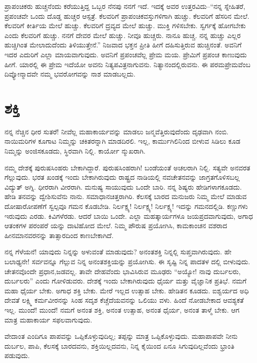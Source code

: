 ಪ್ರಾಪಂಚಿಕರು ಹುಚ್ಚನೆಂದು ಕರೆಯುತ್ತಿದ್ದ ಒಬ್ಬರ ನೆನಪು ನನಗೆ ಇದೆ. ಇದಕ್ಕೆ ಅವರ ಉತ್ತರವಿದು–“ನನ್ನ ಸ್ನೇಹಿತರೆ, ಪ್ರಪಂಚವೇ ಒಂದು ದೊಡ್ಡ ಹುಚ್ಚರ ಆಸ್ಪತ್ರೆ. ಕೆಲವರಿಗೆ ಪ್ರಾಪಂಚಿಕವಸ್ತುಗಳಿಗಾಗಿ ಹುಚ್ಚು. ಕೆಲವರಿಗೆ ಹೆಸರಿನ ಮೇಲೆ. ಕೆಲವರಿಗೆ ಕೀರ್ತಿಯ ಮೇಲೆ ಹುಚ್ಚು. ಕೆಲವರಿಗೆ ದ್ರವ್ಯದ ಮೇಲೆ ಹುಚ್ಚು. ಮುಕ್ತಿ ಗಳಿಸಬೇಕು. ಸ್ವರ್ಗಕ್ಕೆ ಹೋಗಬೇಕು ಎಂದು ಕೆಲವರಿಗೆ ಹುಚ್ಚು. ನನಗೆ ದೇವರ ಮೇಲೆ ಹುಚ್ಚು. ನೀವೂ ಹುಚ್ಚರು. ನಾನೂ ಹುಚ್ಚ. ನನ್ನ ಹುಚ್ಚು ಎಲ್ಲರ ಹುಚ್ಚಿಗಿಂತ ಮೇಲಾದುದೆಂದು ತಿಳಿಯುತ್ತೇನೆ.” ನಿಜವಾದ ಭಕ್ತನ ಪ್ರೀತಿ ಹೀಗೆ ದಹಿಸುತ್ತಿರುವ ಹುಚ್ಚಿನಂತೆ. ಅವನಿಗೆ ಇದರ ಎದುರಿಗೆ ಎಲ್ಲಾ ಮಾಯವಾಗುವುದು. ಅವನಿಗೆ ಪ್ರಪಂಚವೆಲ್ಲ ಪ್ರೇಮ ಮಯ. ಪ್ರೇಮಿಗೆ ಪ್ರಪಂಚ ಕಾಣುವುದು ಹೀಗೆ. ಯಾರಲ್ಲಿ ಈ ಪ್ರೇಮ ಇದೆಯೋ ಅವನು ನಿತ್ಯಪವಿತ್ರನಾಗುವನು. ನಿತ್ಯಾನಂದಲ್ಲಿರುವನು. ಈ ಪರಮಪ್ರೇಮವೆಂಬ ದಿವ್ಯೋನ್ಮಾದವೇ ನಮ್ಮ ಭವರೋಗವನ್ನು ನಾಶ ಮಾಡಬಲ್ಲದು.


\section{ಶಕ್ತಿ}

ನನ್ನ ನೆಚ್ಚಿನ ಧೀರ ಸುತರೆ! ನೀವೆಲ್ಲ ಮಹಾಕಾರ್ಯವನ್ನು ಮಾಡಲು ಜನ್ಮವೆತ್ತಿರುವುದೆಂದು ದೃಢವಾಗಿ ನಂಬಿ. ನಾಯಿಮರಿಗಳ ಕೂಗಾಟ ನಿಮ್ಮನ್ನು ಚಕಿತರನ್ನಾಗಿ ಮಾಡದಿರಲಿ. ಇಲ್ಲ, ಕಾರ್ಮುಗಿಲಿನಿಂದ ಬೀಳುವ ಸಿಡಿಲು ಕೂಡ ನಿಮ್ಮನ್ನು ಅಂಜಿಸಕೂಡದು, ಸ್ಥಿರವಾಗಿ ನಿಲ್ಲಿ. ಕಾರ್ಯೋ ನ್ಮುಖರಾಗಿ.

ನಮ್ಮ ದೇಶಕ್ಕೆ ಪುರುಷಸಿಂಹರು ಬೇಕಾಗಿದ್ದಾರೆ. ಪುರುಷಸಿಂಹರಾಗಿ! ಬಂಡೆಯಂತೆ ಅಚಲರಾಗಿ ನಿಲ್ಲಿ. ಸತ್ಯವೇ ಅನವರತ ಗೆಲ್ಲುವುದು. ಭರತ ಖಂಡಕ್ಕೆ ಇಂದು ಬೇಕಾಗಿರುವುದು ರಾಷ್ಟ್ರದ ನಾಡಿಯಲ್ಲಿ ನವಚೇತನವನ್ನು ಜಾಗ್ರತಗೊಳಿಸಬಲ್ಲ ವಿದ್ಯುತ್ ಅಗ್ನಿ. ಧೀರರಾಗಿ ವೀರರಾಗಿ. ಮನುಷ್ಯ ಸಾಯುವುದು ಒಂದೇ ಬಾರಿ. ನನ್ನ ಶಿಷ್ಯರು ಹೇಡಿಗಳಾಗಕೂಡದು. ಹೇಡಿ ತನವನ್ನು ದ್ವೇಶಿಸುವೆನು ನಾನು. ಸಮಾಧಾನಚಿತ್ತರಾಗಿರಿ. ಕೆಲಸಕ್ಕೆ ಬಾರದ ಮನುಜರು ನಿಮ್ಮ ಮೇಲೆ ಮಾಡುವ ದೋಷಾರೋಪಣೆಗೆ ಸ್ವಲ್ಪವೂ ಗಮನ ಕೊಡಬೇಡಿ. ನಿರ್ಲಕ್ಷ್ಯ! ನಿರ್ಲಕ್ಷ್ಯ! ನಿರ್ಲಕ್ಷ್ಯ! ಇದನ್ನು ಗಮನದಲ್ಲಿಡಿ. ಕಣ್ಣುಗಳು ಇರುವುದು ಎರಡು. ಕಿವಿಗಳೆರಡು. ಆದರೆ ಬಾಯಿ ಒಂದೇ. ಎಲ್ಲಾ ಮಹತ್ಕಾರ್ಯಗಳೂ ಜಯಪ್ರದವಾಗುವುದು, ಅಗಾಧ ಆತಂಕಗಳ ಪರಂಪರೆ ಯನ್ನು ದಾಟಿಹೋದ ಮೇಲೆ. ನಿಮ್ಮ ಪೌರುಷ ಪ್ರಯೋಗಿಸಿ, ಕಾಮಕಾಂಚನ ವಶರಾದ ಹೀನಮಾನವರನನ್ನು ತಾತ್ಸಾರದಿಂದ ಕಾಣಬೇಕಾಗಿದೆ.

ನನ್ನ ಗೆಳೆಯನೆ! ಯಾವುದು ನಿನ್ನನ್ನು ಅಳುವಂತೆ ಮಾಡುವುದು? ಅನಂತಶಕ್ತಿ ನಿನ್ನಲ್ಲಿ ಸುಪ್ತವಾಗಿರುವುದು. ಹೇ ಬಲಾಢ್ಯನೇ! ಸರ್ವವನ್ನೂ ಗೆಲ್ಲುವ ನಿನ್ನ ಅನಂತಶಕ್ತಿಯನ್ನು ಪ್ರಯೋಗಿಸು. ಈ ಸೃಷ್ಟಿ ನಿನ್ನ ಪಾದತಳ ದಲ್ಲಿ ಬೀಳುವುದು. ಚೇತನವೊಂದೇ ಪ್ರಧಾನ,ಜಡವಲ್ಲ. ತಾವೇ ದೇಹವೆಂದು ಭಾವಿಸಿರುವ ಮೂಢರು “ಅಯ್ಯೋ! ನಾವು ದುರ್ಬಲರು, ದುರ್ಬಲರು” ಎಂದು ಗೋಳಿಡುವರು. ದೇಶಕ್ಕೆ ಇಂದು ಬೇಕಾಗಿರುವುದು ಧೈರ್ಯ ಮತ್ತು ವೈಜ್ಞಾನಿಕ ಪ್ರತಿಭೆ. ನಮಗೆ ಮಹಾ ಧೈರ್ಯ ಬೇಕು. ಅಗಾಧ ಶಕ್ತಿ ಬೇಕು. ಮೇರೆ ಇಲ್ಲದ ಉತ್ಸಾಹ ಬೇಕು. ಹೇಡಿತನ ಕೂಡದು. ಐಶ್ವರ್ಯದ ಅಧಿ ದೇವತೆ ಲಕ್ಷ್ಮಿ ಕರ್ಮವೀರನನ್ನು ಸಿಂಹ ಸದೃಶ ಕೆಚ್ಚೆದೆಯವನನ್ನು ಒಲಿಯು ವಳು. ಹಿಂದೆ ನೋಡಬೇಕಾದ ಆವಶ್ಯಕತೆ ಇಲ್ಲ. ಮುಂದೆ! ಮುಂದೆ! ನಮಗೆ ಅನಂತ ಶಕ್ತಿ, ಅನಂತ ಉತ್ಸಾಹ, ಅನಂತ ಧೈರ್ಯ, ಅನಂತ ತಾಳ್ಮೆ ಬೇಕು. ಆಗ ಮಾತ್ರ ಮಹಾಕಾರ್ಯ ಸಫಲವಾಗುವುದು.

ವೇದಾಂತ ಎಂದಿಗೂ ಪಾಪವನ್ನು ಒಪ್ಪಿಕೊಳ್ಳುವುದಿಲ್ಲ; ತಪ್ಪನ್ನು ಮಾತ್ರ ಒಪ್ಪಿಕೊಳ್ಳುವುದು. ಮಹಾಪಾಪವೇ ನೀನು ದುರ್ಬಲ, ಪಾಪಿ, ಕೆಲಸಕ್ಕೆ ಬಾರದವನು, ಶಕ್ತಿಯಿಲ್ಲದವನು, ನಿನ್ನ ಕೈಯಿಂದ ಏನೂ ಸಿಗುವುದಿಲ್ಲವೆಂದು ಭ್ರಾಂತಿ ಪಡುವುದು.

